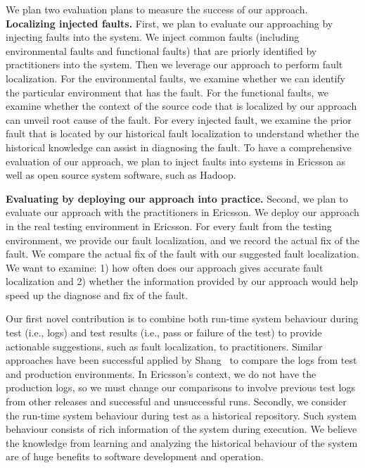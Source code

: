 We plan two evaluation plans to measure the success of our approach. 
\noindent \textbf{Localizing injected faults.} First, we plan to evaluate our approaching by injecting faults into the system. We inject common faults (including environmental faults and functional faults) that are priorly identified by practitioners into the system. Then we leverage our approach to perform fault localization. For the environmental faults, we examine whether we can identify the particular environment that has the fault. For the functional faults, we examine whether the context of the source code that is localized by our approach can unveil root cause of the fault. For every injected fault, we examine the prior fault that is located by our historical fault localization to understand whether the historical knowledge can assist in diagnosing the fault. To have a comprehensive evaluation of our approach, we plan to inject faults into systems in Ericsson as well as open source system software, such as Hadoop.

\noindent \textbf{Evaluating by deploying our approach into practice.} Second, we plan to evaluate our approach with the practitioners in Ericsson. We deploy our approach in the real testing environment in Ericsson. For every fault from the testing environment, we provide our fault localization, and we record the actual fix of the fault. We compare the actual fix of the fault with our suggested fault localization. We want to examine: 1) how often does our approach gives accurate fault localization and 2) whether the information provided by our approach would help speed up the diagnose and fix of the fault.




Our first novel contribution is to combine both run-time system behaviour during test (i.e., logs) and test results (i.e., pass or failure of the test) to provide actionable suggestions, such as fault localization, to practitioners. Similar approaches have been successful applied by Shang~\cite{Shang:2013:ADB:2486788.2486842} to compare the logs from test and production environments. In Ericsson's context, we do not have the production logs, so we must change our comparisons to involve previous test logs from other releases and successful and unsuccessful runs. Secondly, we consider the run-time system behaviour during test as a historical repository. Such system behaviour consists of rich information of the system during execution. We believe the knowledge from learning and analyzing the historical behaviour of the system are of huge benefits to software development and operation.

